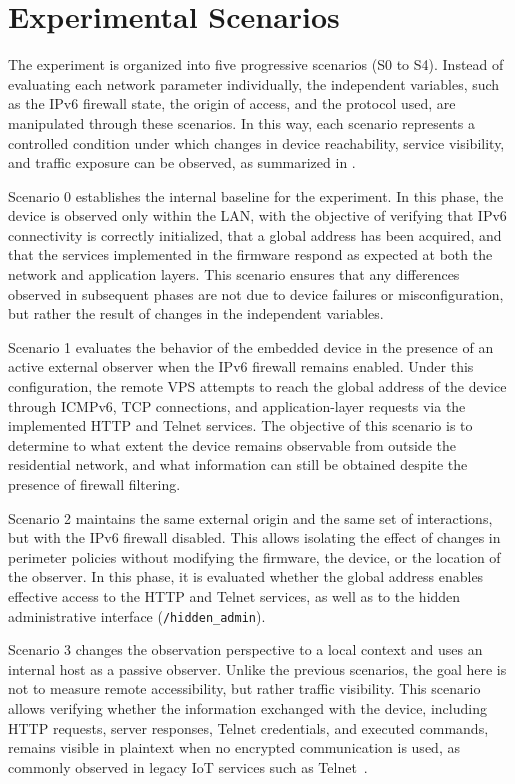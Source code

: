 \section{Experimental Scenarios}\label{sec:experimental-scenarios} 
The experiment is organized into five progressive scenarios (S0 to S4). Instead of evaluating each network parameter individually, the independent variables, such as the IPv6 firewall state, the origin of access, and the protocol used, are manipulated through these scenarios. In this way, each scenario represents a controlled condition under which changes in device reachability, service visibility, and traffic exposure can be observed, as summarized in .


Scenario 0 establishes the internal baseline for the experiment. In this phase, the device is observed only within the LAN, with the objective of verifying that IPv6 connectivity is correctly initialized, that a global address has been acquired, and that the services implemented in the firmware respond as expected at both the network and application layers. This scenario ensures that any differences observed in subsequent phases are not due to device failures or misconfiguration, but rather the result of changes in the independent variables.

Scenario 1 evaluates the behavior of the embedded device in the presence of an active external observer when the IPv6 firewall remains enabled. Under this configuration, the remote VPS attempts to reach the global address of the device through ICMPv6, TCP connections, and application-layer requests via the implemented HTTP and Telnet services. The objective of this scenario is to determine to what extent the device remains observable from outside the residential network, and what information can still be obtained despite the presence of firewall filtering.

Scenario 2 maintains the same external origin and the same set of interactions, but with the IPv6 firewall disabled. This allows isolating the effect of changes in perimeter policies without modifying the firmware, the device, or the location of the observer. In this phase, it is evaluated whether the global address enables effective access to the HTTP and Telnet services, as well as to the hidden administrative interface (\texttt{/hidden\_admin}).

Scenario 3 changes the observation perspective to a local context and uses an internal host as a passive observer. Unlike the previous scenarios, the goal here is not to measure remote accessibility, but rather traffic visibility. This scenario allows verifying whether the information exchanged with the device, including HTTP requests, server responses, Telnet credentials, and executed commands, remains visible in plaintext when no encrypted communication is used, as commonly observed in legacy IoT services such as Telnet~\cite{antonakakis2017mirai}.

